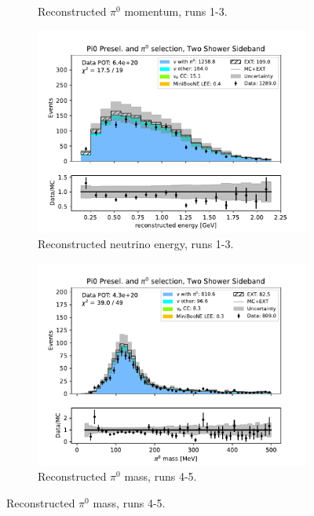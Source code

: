 \begin{figure}[H]
\begin{subfigure}{0.33\linewidth}
        \caption{Reconstructed $\pi^0$ momentum, runs 1-3.}
    \end{subfigure}%
    \begin{subfigure}{0.33\linewidth}
        \includegraphics[width=\linewidth]{technote/Sidebands/Figures/TwoShowerSideband/two_shr_sideband_reco_e_run123_PI0_PI0.pdf}
        \caption{Reconstructed neutrino energy, runs 1-3.}
    \end{subfigure}
    \begin{subfigure}{0.33\linewidth}
        \includegraphics[width=\linewidth]{technote/Sidebands/Figures/TwoShowerSideband/two_shr_sideband_pi0_mass_Y_corr_run4b4c4d5_PI0_PI0.pdf}
        \caption{Reconstructed $\pi^0$ mass, runs 4-5.}
    \end{subfigure}%

\end{figure}
